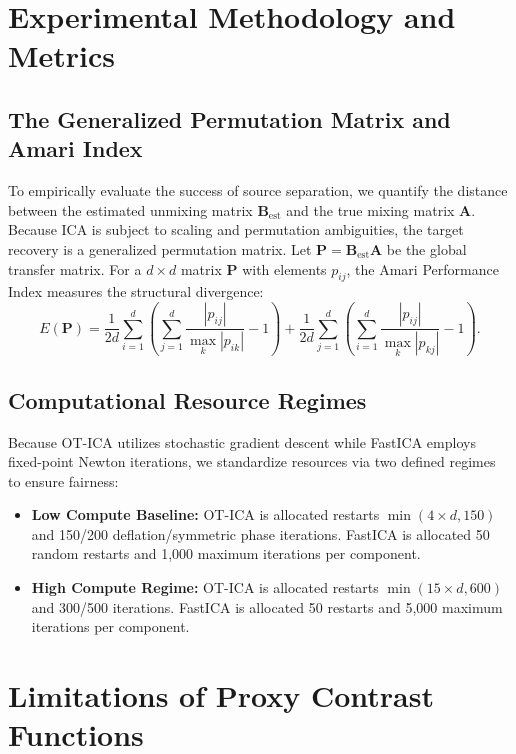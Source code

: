\documentclass{tpm2026} %
\begin{document}
\section{Experimental Methodology and Metrics}
\label{app:experimental_setup}

\subsection{The Generalized Permutation Matrix and Amari Index}
To empirically evaluate the success of source separation, we quantify the distance between the estimated unmixing matrix $\mathbf{B}_{\text{est}}$ and the true mixing matrix $\mathbf{A}$. Because ICA is subject to scaling and permutation ambiguities, the target recovery is a generalized permutation matrix. Let $\mathbf{P} = \mathbf{B}_{\text{est}} \mathbf{A}$ be the global transfer matrix. For a $d \times d$ matrix $\mathbf{P}$ with elements $p_{ij}$, the Amari Performance Index \citep{amari1996new} measures the structural divergence:
\begin{equation}
    E(\mathbf{P}) = \frac{1}{2d} \sum_{i=1}^d \left( \sum_{j=1}^d \frac{|p_{ij}|}{\max_k |p_{ik}|} - 1 \right) + \frac{1}{2d} \sum_{j=1}^d \left( \sum_{i=1}^d \frac{|p_{ij}|}{\max_k |p_{kj}|} - 1 \right).
\end{equation}

\subsection{Computational Resource Regimes}
Because OT-ICA utilizes stochastic gradient descent while FastICA employs fixed-point Newton iterations, we standardize resources via two defined regimes to ensure fairness:
\begin{itemize}
    \item \textbf{Low Compute Baseline:} OT-ICA is allocated restarts $\min(4 \times d, 150)$ and 150/200 deflation/symmetric phase iterations. FastICA is allocated 50 random restarts and 1,000 maximum iterations per component.
    \item \textbf{High Compute Regime:} OT-ICA is allocated restarts $\min(15 \times d, 600)$ and 300/500 iterations. FastICA is allocated 50 restarts and 5,000 maximum iterations per component.
\end{itemize}

\section{Limitations of Proxy Contrast Functions}
\label{app:proxy_limits}
\end{document}
